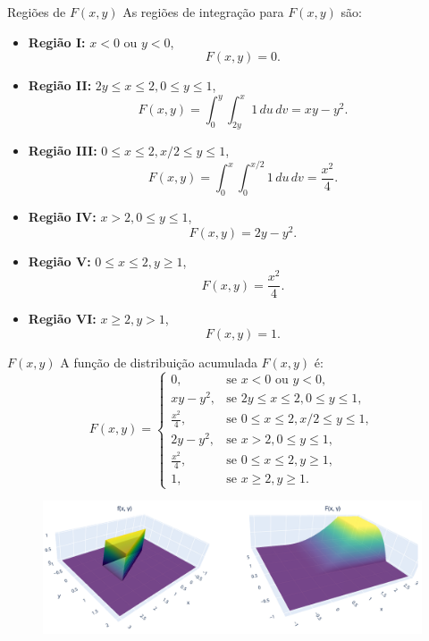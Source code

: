 \begin{frame}{Regiões de \(F(x, y)\)}
	As regiões de integração para \(F(x, y)\) são:
	\begin{itemize}
		\item \textbf{Região I:} \(x < 0 \text{ ou } y < 0\),
		\[
		F(x, y) = 0.
		\]
		\item \textbf{Região II:} \(2y \leq x \leq 2, 0 \leq y \leq 1\),
		\[
		F(x, y) = \int_{0}^{y} \int_{2y}^x 1 \, du \, dv = xy - y^2.
		\]
		\item \textbf{Região III:} \(0 \leq x \leq 2, x/2 \leq y \leq 1\),
		\[
		F(x, y) = \int_{0}^x \int_{0}^{x/2} 1 \, du \, dv = \frac{x^2}{4}.
		\]
		\item \textbf{Região IV:} \(x > 2, 0 \leq y \leq 1\),
		\[
		F(x, y) = 2y - y^2.
		\]
		\item \textbf{Região V:} \(0 \leq x \leq 2, y \geq 1\),
		\[
		F(x, y) = \frac{x^2}{4}.
		\]
		\item \textbf{Região VI:} \(x \geq 2, y > 1\),
		\[
		F(x, y) = 1.
		\]
	\end{itemize}
\end{frame}

\begin{frame}{\(F(x, y)\)}
	\small
	A função de distribuição acumulada \(F(x, y)\) é:
	\[
	F(x, y) =
	\begin{cases}
		0, & \text{se } x < 0 \text{ ou } y < 0, \\
		xy - y^2, & \text{se } 2y \leq x \leq 2, 0 \leq y \leq 1, \\
		\frac{x^2}{4}, & \text{se } 0 \leq x \leq 2, x/2 \leq y \leq 1, \\
		2y - y^2, & \text{se } x > 2, 0 \leq y \leq 1, \\
		\frac{x^2}{4}, & \text{se } 0 \leq x \leq 2, y \geq 1, \\
		1, & \text{se } x \geq 2, y \geq 1.
	\end{cases}
	\]
		\begin{figure}[!htb]
		\begin{center}
			\includegraphics[scale=0.3]{Exemp2fF.png}
		\end{center}
	\end{figure} 
\end{frame}


